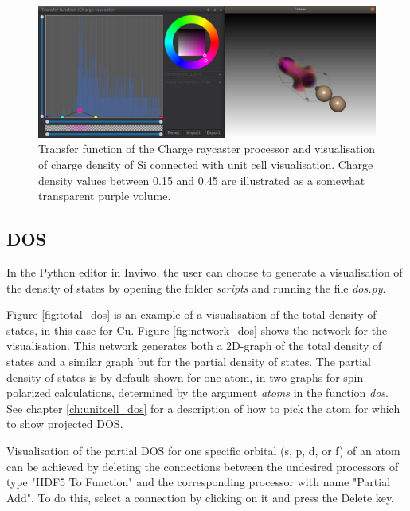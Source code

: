\documentclass[a4paper,12pt]{article}
\begin{document}
\begin{figure} [H]
\centering
\includegraphics[scale=0.4]{screenshot_transfer_function_transparent.png}
\caption{Transfer function of the Charge raycaster processor and visualisation of charge density of Si connected with unit cell visualisation. Charge density values between 0.15 and 0.45 are illustrated as a somewhat transparent purple volume.}
\label{fig:screenshot_transfer_function}
\end{figure}

\subsection{DOS}
In the Python editor in Inviwo, the user can choose to generate a visualisation of the density of states by opening the folder \textit{scripts} and running the file \textit{dos.py}.

Figure \ref{fig:total_dos} is an example of a visualisation of the total density of states, in this case for Cu. Figure \ref{fig:network_dos} shows the network for the visualisation. This network generates both a 2D-graph of the total density of states and a similar graph but for the partial density of states. The partial density of states is by default shown for one atom, in two graphs for spin-polarized calculations, determined by the argument \textit{atoms} in the function \textit{dos}. See chapter \ref{ch:unitcell_dos} for a description of how to pick the atom for which to show projected DOS.

Visualisation of the partial DOS for one specific orbital (s, p, d, or f) of an atom can be achieved by deleting the connections between the undesired processors of type "HDF5 To Function" and the corresponding processor with name "Partial Add". To do this, select a connection by clicking on it and press the Delete key.
\end{document}
